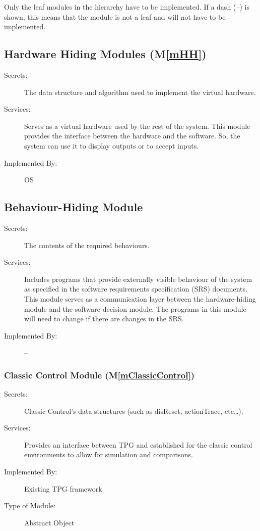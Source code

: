 \documentclass[12pt, titlepage]{article}
\newcommand{\mref}[1]{M\ref{#1}}
\begin{document}
Only the leaf modules in the hierarchy have to be implemented. If a dash
(\emph{--}) is shown, this means that the module is not a leaf and will not have
to be implemented.

\subsection{Hardware Hiding Modules (\mref{mHH})}

\begin{description}
\item[Secrets:]The data structure and algorithm used to implement the virtual
  hardware.
\item[Services:]Serves as a virtual hardware used by the rest of the
  system. This module provides the interface between the hardware and the
  software. So, the system can use it to display outputs or to accept inputs.
\item[Implemented By:] OS
\end{description}

\subsection{Behaviour-Hiding Module}

\begin{description}
\item[Secrets:]The contents of the required behaviours.
\item[Services:]Includes programs that provide externally visible behaviour of
  the system as specified in the software requirements specification (SRS)
  documents. This module serves as a communication layer between the
  hardware-hiding module and the software decision module. The programs in this
  module will need to change if there are changes in the SRS.
\item[Implemented By:] --
\end{description}

\subsubsection{Classic Control Module (\mref{mClassicControl})}

\begin{description}
\item[Secrets:]Classic Control's data structures (such as disReset, actionTrace, etc…).
\item[Services:]Provides an interface between TPG and established for the classic control environments to allow for simulation and comparisons.
\item[Implemented By:] Existing TPG framework
\item[Type of Module:] Abstract Object
\end{description}
\end{document}
